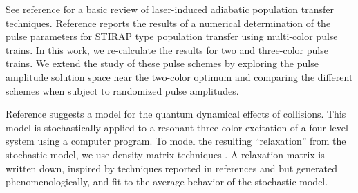 See reference \cite{Vitanov:2001a} for a basic review of laser-induced adiabatic population transfer techniques. Reference \cite{Sola:1999a} reports the results of a numerical determination of the pulse parameters for STIRAP type population transfer using multi-color pulse trains. In this work, we re-calculate the results for two and three-color pulse trains. We extend the study of these pulse schemes by exploring the pulse amplitude solution space near the two-color optimum and comparing the different schemes when subject to randomized pulse amplitudes.

Reference \cite{Siegman:1986a} suggests a model for the quantum dynamical effects of collisions. This model is stochastically applied to a resonant three-color excitation of a four level system using a computer program. To model the resulting ``relaxation'' from the stochastic model, we use density matrix techniques \cite{Fano:1957a,Schirmer:2000a,Khaneja:2003a}. A relaxation matrix is written down, inspired by techniques reported in references \cite{Arimondo:1996a} and \cite{Kelley:1994a} but generated phenomenologically, and fit to the average behavior of the stochastic model.
